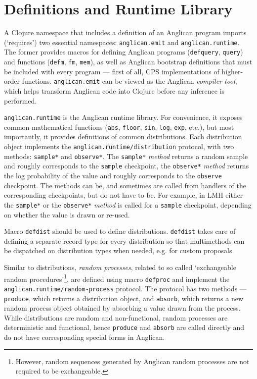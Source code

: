 \documentclass[preprint]{sigplanconf}
\begin{document}
\section{Definitions and Runtime Library}

A Clojure namespace that includes a definition of an Anglican
program imports (`requires') two essential namespaces:
\texttt{anglican.emit} and \texttt{anglican.runtime}. The former
provides macros for defining Anglican programs
(\texttt{defquery}, \texttt{query}) and functions
(\texttt{defm}, \texttt{fm}, \texttt{mem}), as well as Anglican
bootstrap definitions that must be included with every program
--- first of all, CPS implementations of higher-order functions.
\texttt{anglican.emit} can be viewed as the Anglican
\textit{compiler tool}, which helps transform Anglican code into
Clojure before any inference is performed.

\texttt{anglican.runtime} is the Anglican runtime library. For
convenience, it exposes common mathematical functions
(\texttt{abs}, \texttt{floor}, \texttt{sin}, \texttt{log},
\texttt{exp}, etc.), but most importantly, it provides
definitions of common distributions. Each distribution object
implements the \texttt{anglican.runtime/{\linebreak[0]}distribution} protocol,
with two methods: \texttt{sample*} and \texttt{observe*}.
The \texttt{sample*} \textit{method} returns a random sample and
roughly corresponds to the \texttt{sample} checkpoint,
the \texttt{observe*} \textit{method} returns the log probability
of the value and roughly corresponds to the \texttt{observe}
checkpoint. The methods can be, and sometimes are called from
handlers of the corresponding checkpoints, but do not have to
be. For example, in LMH either the \texttt{sample*} or
the \texttt{observe*} \textit{method} is called for a
\texttt{sample} checkpoint, depending on whether the value is
drawn or re-used. 

Macro \texttt{defdist} should be used to define distributions.
\texttt{defdist} takes care of defining a separate record type
for every distribution so that multimethods can be dispatched on
distribution types when needed, e.g. for custom proposals.

Similar to distributions, \textit{random processes}, related to
so called `exchangeable random procedures'\footnote{However, random sequences
generated by Anglican random processes are not required to be
exchangeable.}, are defined using
macro \texttt{defproc} and implement the
\texttt{anglican.runtime/{\linebreak[0]}random-process} protocol. The protocol
has two methods --- \texttt{produce}, which returns a
distribution object, and \texttt{absorb}, which returns a new
random process object obtained by absorbing a value drawn from
the process. While distributions are random and non-functional,
random processes are deterministic and functional, hence
\texttt{produce} and \texttt{absorb} are called directly and do
not have corresponding special forms in Anglican.
\end{document}
